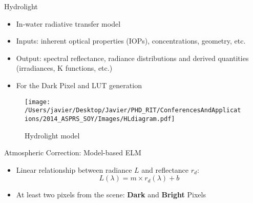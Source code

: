 \documentclass{beamer}
\begin{document}
\begin{frame}{}
\begin{columns}[t]
\begin{column}{.3\linewidth}
\begin{block}{Hydrolight}
\small
\begin{itemize}
  \item In-water radiative transfer model
  \vspace{0.5cm}
  \item Inputs: inherent optical properties (IOPs), concentrations, geometry, etc.
  \vspace{0.5cm}
  \item Output: spectral reflectance, radiance distributions and derived quantities (irradiances, K functions, etc.)
  \vspace{0.5cm}
  \item For the Dark Pixel and LUT generation
\end{itemize}
\vspace{1cm}
\begin{figure}[H]
    \texttt{[image: /Users/javier/Desktop/Javier/PHD\_RIT/ConferencesAndApplications/2014\_ASPRS\_SOY/Images/HLdiagram.pdf]}
    \caption{Hydrolight model}
\end{figure}
\end{block}

\vspace{-.5cm}
\begin{block}{Atmospheric Correction: Model-based ELM}
\begin{itemize}
  \item \small Linear relationship between radiance $L$ and reflectance $r_d$:
\begin{equation}\label{eq:ELM}
  L(\lambda)=m\times r_d(\lambda)+b
\end{equation}

\vspace{0.005cm}
\item \small At least two pixels from the scene: {\bf \small Dark} and {\bf \small Bright} Pixels

\end{itemize}

\begin{figure}[htb]
  \centering
{}
\end{figure}
\end{block}
\end{column}
\end{columns}
\end{frame}
\end{document}
